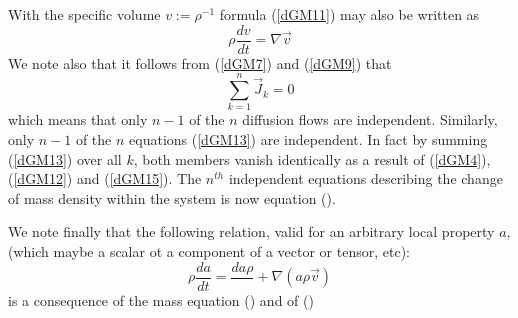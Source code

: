 With the specific volume $v:=\rho^{-1}$ formula (\ref{dGM11}) may also be written as
\begin{equation}
\rho \frac{dv}{dt} = \nabla \vec{v}
\label{dGM13}
\end{equation}
We note also that it follows from (\ref{dGM7}) and (\ref{dGM9}) that 
\begin{equation}
\sum_{k=1}^n \vec{J}_k =0 
\label{dGM15}
\end{equation}
which means that only $n-1$ of the $n$ diffusion flows are independent.
Similarly, only $n-1$ of the $n$ equations (\ref{dGM13}) are independent. In fact by summing (\ref{dGM13}) over all $k$, both members vanish identically as a result of (\ref{dGM4}), (\ref{dGM12}) and (\ref{dGM15}). The $n^{th}$ independent equations describing the change of mass density within the system is now equation (\label{dGM14}).

We note finally that the following relation, valid for an arbitrary local property $a$, (which maybe a scalar ot a component of a vector or tensor, etc):
\begin{equation}
\rho \frac{da}{dt} = \frac{d a\rho}{} + \nabla ( a \rho \vec{v})
\label{dGM16}
\end{equation}
is a consequence of the mass equation (\label{dGM5}) and of (\label{dGM8})